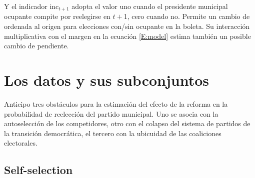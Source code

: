 \documentclass[letter,12pt]{article}
\begin{document}
Y el indicador inc$_{t+1}$ adopta el valor uno cuando el presidente municipal ocupante compite por reelegirse en $t+$1, cero cuando no. Permite un cambio de ordenada al origen para elecciones con/sin ocupante en la boleta. Su interacción multiplicativa con el margen en la ecuación \ref{E:model} estima también un posible cambio de pendiente.

\section{Los datos y sus subconjuntos}

\noindent Anticipo tres obstáculos para la estimación del efecto de la reforma en la probabilidad de reelección del partido municipal. Uno se asocia con la autoselección de los competidores, otro con el colapso del sistema de partidos de la transición democrática, el tercero con la ubicuidad de las coaliciones electorales.

\subsection{Self-selection}
\end{document}
